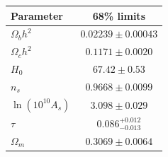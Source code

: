 \begin{tabular} { l  c}

 Parameter &  68\% limits\\
\hline
{\boldmath$\Omega_b h^2   $} & $0.02239\pm 0.00043        $\\

{\boldmath$\Omega_c h^2   $} & $0.1171\pm 0.0020          $\\

{\boldmath$H_0            $} & $67.42\pm 0.53             $\\

{\boldmath$n_s            $} & $0.9668\pm 0.0099          $\\

{\boldmath$\ln(10^{10} A_s)$} & $3.098\pm 0.029            $\\

{\boldmath$\tau           $} & $0.086^{+0.012}_{-0.013}   $\\

$\Omega_m                  $ & $0.3069\pm 0.0064          $\\
\hline
\end{tabular}